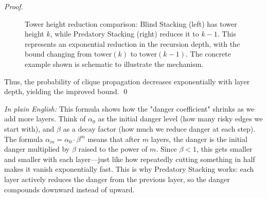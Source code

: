 \documentclass[12pt]{article}
\begin{document}
\begin{proof}
\begin{figure}[h]
\caption{Tower height reduction comparison: Blind Stacking (left) has tower height $k$, while Predatory Stacking (right) reduces it to $k-1$. This represents an exponential reduction in the recursion depth, with the bound changing from $\text{tower}(k)$ to $\text{tower}(k-1)$. The concrete example shown is schematic to illustrate the mechanism.}
\label{fig:tower-reduction}
\end{figure}

Thus, the probability of clique propagation decreases exponentially with layer depth, yielding the improved bound. \qed
\end{proof}

\textit{In plain English:} This formula shows how the "danger coefficient" shrinks as we add more layers. Think of $\alpha_0$ as the initial danger level (how many risky edges we start with), and $\beta$ as a decay factor (how much we reduce danger at each step). The formula $\alpha_m = \alpha_0 \cdot \beta^m$ means that after $m$ layers, the danger is the initial danger multiplied by $\beta$ raised to the power of $m$. Since $\beta < 1$, this gets smaller and smaller with each layer—just like how repeatedly cutting something in half makes it vanish exponentially fast. This is why Predatory Stacking works: each layer actively reduces the danger from the previous layer, so the danger compounds downward instead of upward.
\end{document}
